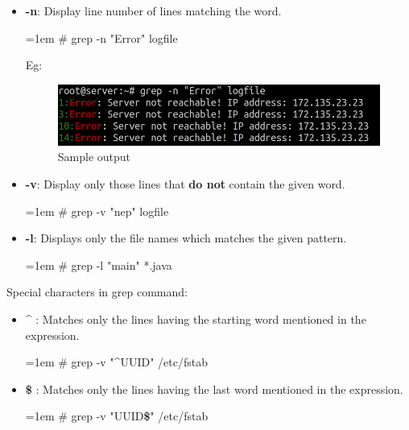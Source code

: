 \begin{flushleft}
\begin{itemize}
\begin{itemize}
			\item \textbf{-n}: Display line number of lines matching the word.
			\bigskip
			\begin{tcolorbox}[breakable,notitle,boxrule=-0pt,colback=black,colframe=black]
				\color{green}
				\font=1em
				\# grep -n "Error" logfile
				\font=4pt
			\end{tcolorbox}
			Eg:
			\begin{figure}[h!]
				\centering
				\includegraphics[scale=.4]{content/chapter7/images/grep1.png}
				\caption{Sample output}
				\label{fig:path23}
			\end{figure}

			\item \textbf{-v}: Display only those lines that \textbf{do not} contain the given word.
			\bigskip
			\begin{tcolorbox}[breakable,notitle,boxrule=-0pt,colback=black,colframe=black]
				\color{green}
				\font=1em
				\# grep -v "nep" logfile
				\font=4pt
			\end{tcolorbox}		

			\item \textbf{-l}: Displays only the file names which matches the given pattern.
			\begin{tcolorbox}[breakable,notitle,boxrule=-0pt,colback=black,colframe=black]
				\color{green}
				\font=1em
				\# grep -l "main" *.java
				\font=4pt
			\end{tcolorbox}					
		\end{itemize}
			Special characters in {grep} command:
			\begin{itemize}
				\item \textbf{\^} : Matches only the lines having the starting word mentioned in the expression.
				\bigskip
				\begin{tcolorbox}[breakable,notitle,boxrule=-0pt,colback=black,colframe=black]
					\color{green}
					\font=1em
					\# grep -v "\textbf{\^}UUID" /etc/fstab
					\font=4pt
				\end{tcolorbox}			
				\item \textbf{\$} : Matches only the lines having the last word mentioned in the expression.
				\bigskip
				\begin{tcolorbox}[breakable,notitle,boxrule=-0pt,colback=black,colframe=black]
					\color{green}
					\fontdimen2\font=1em
					\# grep -v "UUID\textbf{\$}" /etc/fstab
					\fontdimen2\font=4pt
				\end{tcolorbox}									
			\end{itemize}
		

\end{itemize}
\end{flushleft}
